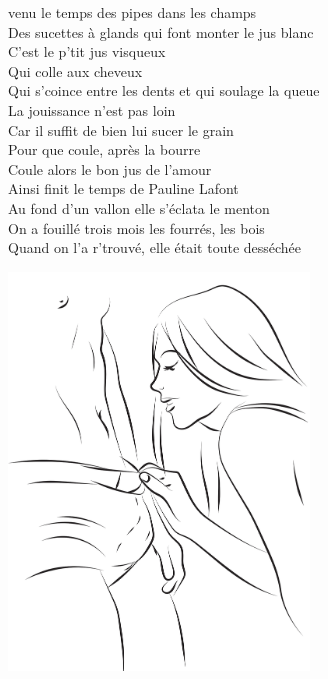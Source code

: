 
 venu le temps des pipes dans les champs
\\Des sucettes à glands qui font monter le jus blanc
\\C'est le p'tit jus visqueux
\\Qui colle aux cheveux
\\Qui s'coince entre les dents et qui soulage la queue
\\La jouissance n'est pas loin
\\Car il suffit de bien lui sucer le grain
\\Pour que coule, après la bourre
\\Coule alors le bon jus de l'amour
\\Ainsi finit le temps de Pauline Lafont
\\Au fond d'un vallon elle s'éclata le menton
\\On a fouillé trois mois les fourrés, les bois
\\Quand on l'a r'trouvé, elle était toute desséchée
\bigskip
\bigskip
\begin{center}
\includegraphics[width=0.6\textwidth]{images/brev68.png}
\end{center}

\breakpage